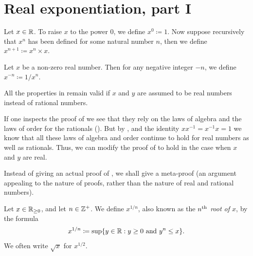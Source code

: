 \section{Real exponentiation, part I}\label{i:sec:5.6}

\begin{defn}\label{i:5.6.1}
  Let \(x \in \mathbb{R}\).
  To raise \(x\) to the power \(0\), we define \(x^0 \coloneqq 1\).
  Now suppose recursively that \(x^n\) has been defined for some natural number \(n\), then we define \(x^{n + 1} \coloneqq x^n \times x\).
\end{defn}

\begin{defn}\label{i:5.6.2}
  Let \(x\) be a non-zero real number.
  Then for any negative integer \(-n\), we define \(x^{-n} \coloneqq 1 / x^n\).
\end{defn}

\begin{prop}\label{i:5.6.3}
  All the properties in  remain valid if \(x\) and \(y\) are assumed to be real numbers instead of rational numbers.
\end{prop}

\begin{meta-proof}[\pf{i:5.6.3}]
If one inspects the proof of  we see that they rely on the laws of algebra and the laws of order for the rationals ().
But by , and the identity \(xx^{-1} = x^{-1} x = 1\) we know that all these laws of algebra and order continue to hold for real numbers as well as rationals.
Thus, we can modify the proof of  to hold in the case when \(x\) and \(y\) are real.
\end{meta-proof}

\begin{note}
  Instead of giving an actual proof of , we shall give a meta-proof
  (an argument appealing to the nature of proofs, rather than the nature of real and rational numbers).
\end{note}

\begin{defn}\label{i:5.6.4}
  Let \(x \in \mathbb{R}_{\geq 0}\), and let \(n \in \mathbb{Z}^+\).
  We define \(x^{1 / n}\), also known as the \emph{\(n^{\operatorname{th}}\) root of \(x\)}, by the formula
  \[
    x^{1 / n} \coloneqq \sup\set{y \in \R : y \geq 0 \text{ and } y^n \leq x}.
  \]
  We often write \(\sqrt{x}\) for \(x^{1 / 2}\).
\end{defn}


